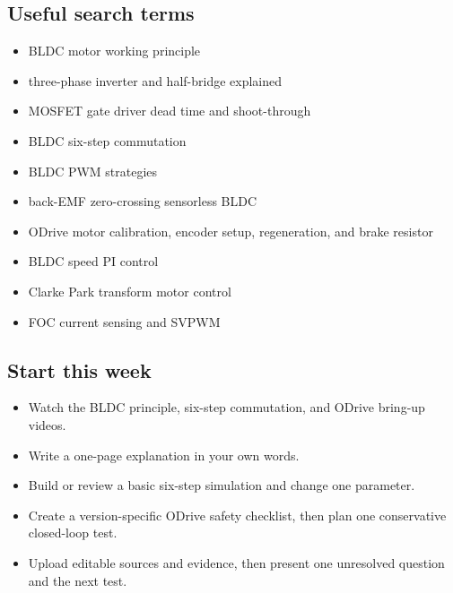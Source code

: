 \documentclass[11pt,a4paper]{article}
\begin{document}
\subsection{Useful search terms}
\begin{itemize}
  \item BLDC motor working principle
  \item three-phase inverter and half-bridge explained
  \item MOSFET gate driver dead time and shoot-through
  \item BLDC six-step commutation
  \item BLDC PWM strategies
  \item back-EMF zero-crossing sensorless BLDC
  \item ODrive motor calibration, encoder setup, regeneration, and brake resistor
  \item BLDC speed PI control
  \item Clarke Park transform motor control
  \item FOC current sensing and SVPWM
\end{itemize}

\subsection{Start this week}
\begin{itemize}
  \item Watch the BLDC principle, six-step commutation, and ODrive bring-up videos.
  \item Write a one-page explanation in your own words.
  \item Build or review a basic six-step simulation and change one parameter.
  \item Create a version-specific ODrive safety checklist, then plan one conservative closed-loop test.
  \item Upload editable sources and evidence, then present one unresolved question and the next test.
\end{itemize}
\end{document}
